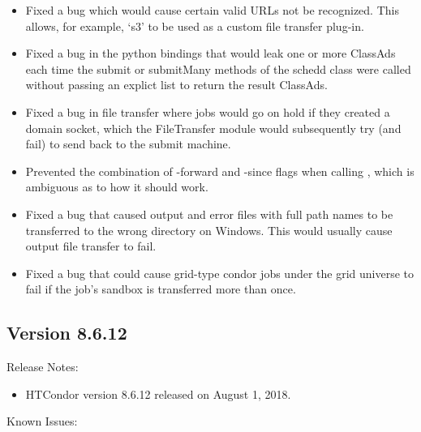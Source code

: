 \begin{itemize}

\item Fixed a bug which would cause certain valid URLs not be recognized.  This
allows, for example, `s3' to be used as a custom file transfer plug-in.

\item Fixed a bug in the python bindings that would leak one or more ClassAds each time
the submit or submitMany methods of the schedd class were called without passing an explict list to
return the result ClassAds.

\item Fixed a bug in file transfer where jobs would go on hold if they created
a domain socket, which the FileTransfer module would subsequently try (and fail) 
to send back to the submit machine.

\item Prevented the combination of -forward and -since flags when calling
, which is ambiguous as to how it should work.

\item Fixed a bug that caused output and error files with full path names
to be transferred to the wrong directory on Windows.  This would usually
cause output file transfer to fail.

\item Fixed a bug that could cause grid-type condor jobs under the grid
universe to fail if the job's sandbox is transferred more than once.

\end{itemize}

\subsection*{\label{sec:New-8-6-12}Version 8.6.12}

\noindent Release Notes:

\begin{itemize}

\item HTCondor version 8.6.12 released on August 1, 2018.

\end{itemize}

\noindent Known Issues:

